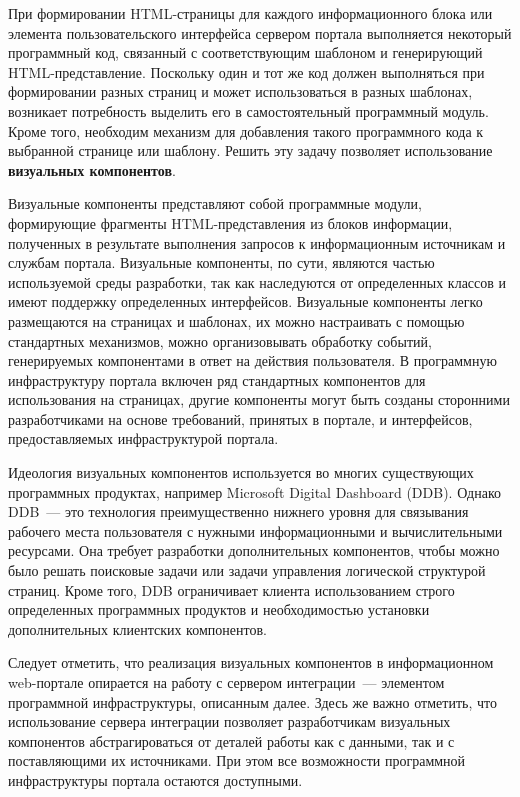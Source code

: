 \begin{multicols}{2}
 При формировании HTML-страницы для каж\-дого информационного блока или
элемента пользовательского интерфейса сервером портала выполняется некоторый
программный код, связанный с соответствующим шаблоном и ге\-не\-ри\-ру\-ющий
 HTML-представление. Поскольку один и тот же код должен выполняться при
формировании разных страниц и может использоваться в разных шаблонах, возникает
потребность выделить его в самостоятельный программный модуль. Кроме того,
необходим механизм для добавления такого программного кода к выбранной странице
или шаблону. Решить эту задачу позволяет использование \textbf{визуальных
компонентов}.

 Визуальные компоненты представляют собой программные модули, формирующие
фрагменты HTML-представления из блоков информации, полученных в результате
выполнения запросов к информационным источникам и службам портала. Визуальные
компоненты, по сути, являются частью используемой среды разработки, так как
наследуются от определенных классов и имеют поддержку определенных интерфейсов.
Визуальные компоненты легко размещаются на страницах и шаблонах, их можно
настраивать с помощью стандартных механизмов, можно организовывать обработку
событий, генерируемых компонентами в ответ на действия пользователя. В программную
инфраструктуру портала включен ряд стандартных компонентов для использования на
страницах, другие компоненты могут быть созданы сторонними разработчиками на
основе требований, принятых в портале, и интерфейсов, предоставляемых
инфраструктурой портала.

 Идеология визуальных компонентов используется во многих существующих
программных продуктах, например Microsoft Digital Dashboard (DDB). Однако DDB~---
это технология преимущественно нижнего уровня для связывания рабочего места
пользователя с нужными информационными и вычислительными ресурсами. Она требует
разработки дополнительных компонентов, чтобы можно было решать поисковые задачи
или задачи управления логической структурой страниц. Кроме того, DDB ограничивает
клиента использованием строго определенных программных продуктов и
необходимостью установки дополнительных клиентских компонентов.

 Следует отметить, что реализация визуальных компонентов в информационном
web-портале опирается на работу с сервером интеграции~--- элементом программной
инфраструктуры, описанным далее. Здесь же важно отметить, что использование сервера
интеграции позволяет разработчикам визуальных компонентов абстрагироваться от
деталей работы как с данными, так и с поставляющими их источниками. При этом все
возможности программной инфраструктуры портала остаются доступными.


\end{multicols}
